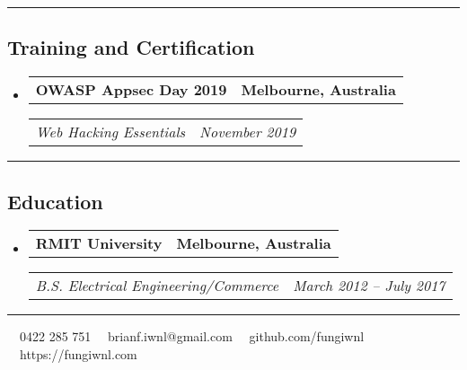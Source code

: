 \documentclass[11pt,letterpaper]{article}
\makeatletter
\newcommand{\headerrow}[2]
{\begin{tabular*}{\linewidth}{l@{\extracolsep{\fill}}r}
#1 &
#2 \\
\end{tabular*}}
\makeatother
\begin{document}
\hrule
\vspace{-1em}
\subsection*{\Large Training and Certification}

\begin{itemize}[leftmargin=1em]
	\parskip=0.1em
		
	\item
	      \headerrow
	      {\textbf{OWASP Appsec Day 2019}}
	      {\textbf{Melbourne, Australia}}
	      \headerrow
	      {\emph{Web Hacking Essentials}}
	      {\emph{November 2019}}
	      	      
\end{itemize}

\hrule
\vspace{-1em}
\subsection*{\Large Education}

\begin{itemize}[leftmargin=1em]
	\parskip=0.1em
		
	\item
	      \headerrow
	      {\textbf{RMIT University}}
	      {\textbf{Melbourne, Australia}}
	      \headerrow
	      {\emph{B.S. Electrical Engineering/Commerce}}
	      {\emph{March 2012 -- July 2017}}
	      	      
\end{itemize}

\hrule
\vspace{-1em}
\begin{center}
	\vspace{0.8cm}
	\raisebox{-0.2\height} {\Large \faPhoneSquare} \ \  0422 285 751 \hfill\raisebox{-0.2\height}{\Large \faEnvelopeSquare} \ \ brianf.iwnl@gmail.com \hfill \raisebox{-0.2\height}{\Large \faGithubSquare} \ \ github.com/fungiwnl \hfill \raisebox{-0.2\height}{\Large \faGlobe} \ \ https://fungiwnl.com
\end{center}
\end{document}
